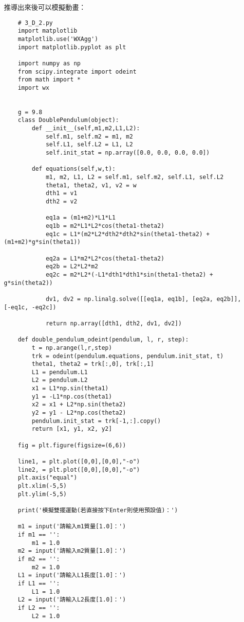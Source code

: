 \documentclass[UTF8,a4paper,12pt]{article}
\begin{document}
推導出來後可以模擬動畫：

\begin{lstlisting}
    # 3_D_2.py
    import matplotlib
    matplotlib.use('WXAgg')
    import matplotlib.pyplot as plt
    
    import numpy as np
    from scipy.integrate import odeint
    from math import *
    import wx
    
    
    g = 9.8
    class DoublePendulum(object):
        def __init__(self,m1,m2,L1,L2):
            self.m1, self.m2 = m1, m2
            self.L1, self.L2 = L1, L2
            self.init_stat = np.array([0.0, 0.0, 0.0, 0.0])
    
        def equations(self,w,t):
            m1, m2, L1, L2 = self.m1, self.m2, self.L1, self.L2
            theta1, theta2, v1, v2 = w
            dth1 = v1
            dth2 = v2
    
            eq1a = (m1+m2)*L1*L1
            eq1b = m2*L1*L2*cos(theta1-theta2)
            eq1c = L1*(m2*L2*dth2*dth2*sin(theta1-theta2) + (m1+m2)*g*sin(theta1))
    
            eq2a = L1*m2*L2*cos(theta1-theta2)
            eq2b = L2*L2*m2
            eq2c = m2*L2*(-L1*dth1*dth1*sin(theta1-theta2) + g*sin(theta2))
    
            dv1, dv2 = np.linalg.solve([[eq1a, eq1b], [eq2a, eq2b]], [-eq1c, -eq2c])
    
            return np.array([dth1, dth2, dv1, dv2])
    
    def double_pendulum_odeint(pendulum, l, r, step):
        t = np.arange(l,r,step)
        trk = odeint(pendulum.equations, pendulum.init_stat, t)
        theta1, theta2 = trk[:,0], trk[:,1]
        L1 = pendulum.L1
        L2 = pendulum.L2
        x1 = L1*np.sin(theta1)
        y1 = -L1*np.cos(theta1)
        x2 = x1 + L2*np.sin(theta2)
        y2 = y1 - L2*np.cos(theta2)
        pendulum.init_stat = trk[-1,:].copy()
        return [x1, y1, x2, y2]
    
    fig = plt.figure(figsize=(6,6))
    
    line1, = plt.plot([0,0],[0,0],"-o")
    line2, = plt.plot([0,0],[0,0],"-o")
    plt.axis("equal")
    plt.xlim(-5,5)
    plt.ylim(-5,5)
    
    print('模擬雙擺運動(若直接按下Enter則使用預設值)：')
    
    m1 = input('請輸入m1質量[1.0]：')
    if m1 == '':
        m1 = 1.0
    m2 = input('請輸入m2質量[1.0]：')
    if m2 == '':
        m2 = 1.0
    L1 = input('請輸入L1長度[1.0]：')
    if L1 == '':
        L1 = 1.0
    L2 = input('請輸入L2長度[1.0]：')
    if L2 == '':
        L2 = 1.0
    

\end{lstlisting}
\end{document}
